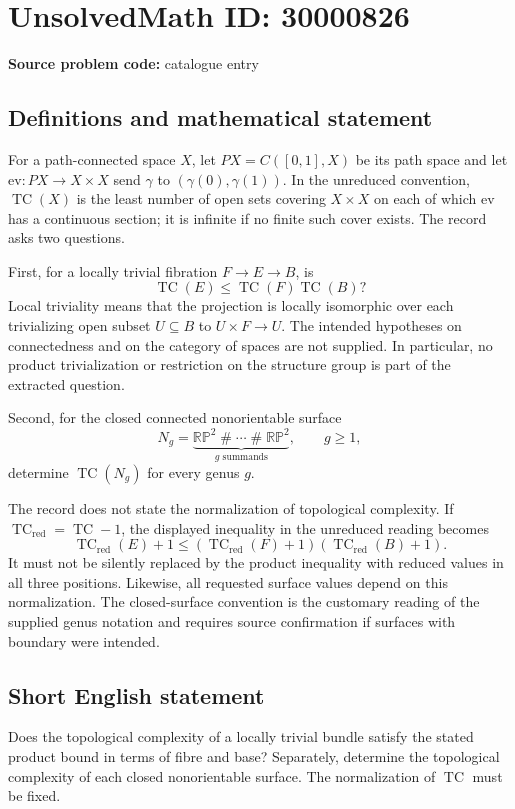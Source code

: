 \documentclass[11pt]{article}
\newcommand{\R}{\mathbb{R}}
\newcommand{\PP}{\mathbb{P}}
\begin{document}
\section*{UnsolvedMath ID: 30000826}
\textbf{Source problem code:} catalogue entry
\subsection{Definitions and mathematical statement}
For a path-connected space \(X\), let \(PX=C([0,1],X)\) be its path space and let \(\mathrm{ev}:PX\to X\times X\) send \(\gamma\) to \((\gamma(0),\gamma(1))\). In the unreduced convention, \(\operatorname{TC}(X)\) is the least number of open sets covering \(X\times X\) on each of which \(\mathrm{ev}\) has a continuous section; it is infinite if no finite such cover exists. The record asks two questions.

First, for a locally trivial fibration \(F\to E\to B\), is
\[
\operatorname{TC}(E)\leq\operatorname{TC}(F)\operatorname{TC}(B)?
\]
Local triviality means that the projection is locally isomorphic over each trivializing open subset \(U\subseteq B\) to \(U\times F\to U\). The intended hypotheses on connectedness and on the category of spaces are not supplied. In particular, no product trivialization or restriction on the structure group is part of the extracted question.

Second, for the closed connected nonorientable surface
\[
N_g=\underbrace{\R\PP^2\mathbin{\#}\cdots\mathbin{\#}\R\PP^2}_{g\text{ summands}},\qquad g\geq1,
\]
determine \(\operatorname{TC}(N_g)\) for every genus \(g\).

The record does not state the normalization of topological complexity. If \(\operatorname{TC}_{\mathrm{red}}=\operatorname{TC}-1\), the displayed inequality in the unreduced reading becomes
\[
\operatorname{TC}_{\mathrm{red}}(E)+1
\leq(\operatorname{TC}_{\mathrm{red}}(F)+1)(\operatorname{TC}_{\mathrm{red}}(B)+1).
\]
It must not be silently replaced by the product inequality with reduced values in all three positions. Likewise, all requested surface values depend on this normalization. The closed-surface convention is the customary reading of the supplied genus notation and requires source confirmation if surfaces with boundary were intended.
\subsection{Short English statement}
Does the topological complexity of a locally trivial bundle satisfy the stated product bound in terms of fibre and base? Separately, determine the topological complexity of each closed nonorientable surface. The normalization of \(\operatorname{TC}\) must be fixed.
\end{document}
